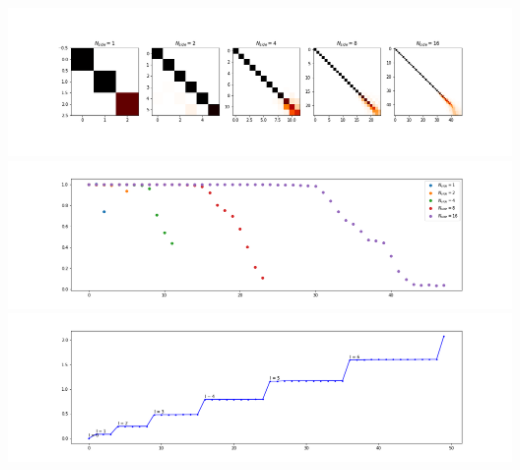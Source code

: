 \begin{minipage}{.5\textwidth}
	\centering
	\includegraphics[width=0.95\linewidth]{../codes/02.HeatKernelGraphLaplacian/HEALPix/06_figures/optimal_thresholded.png}
	\includegraphics[width=0.95\linewidth]{../codes/02.HeatKernelGraphLaplacian/HEALPix/06_figures/optimal_thresholded_diagonal.png}
	\includegraphics[width=0.95\linewidth]{../codes/02.HeatKernelGraphLaplacian/HEALPix/06_figures/optimal_thresholded_eigenvalues.png}
\end{minipage}
